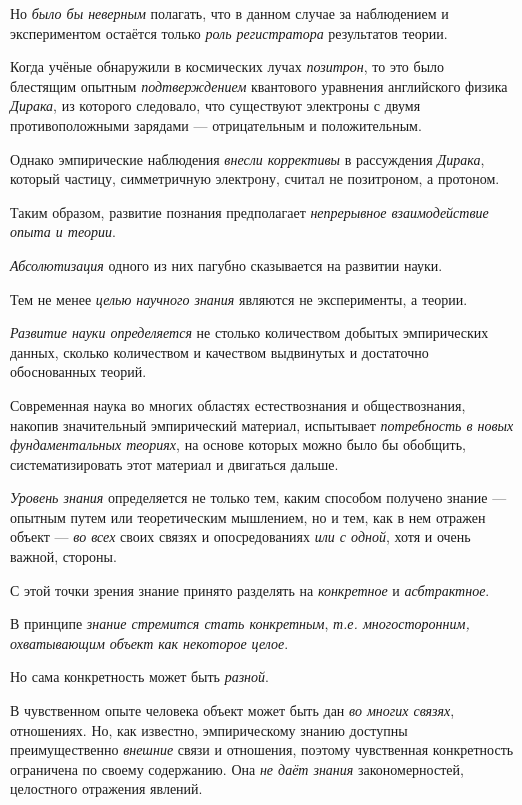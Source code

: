 \documentclass[a4paper,14pt,russian]{extreport}
\begin{document}
Но \emph{было бы неверным} полагать, что в данном случае за наблюдением и экспериментом остаётся только \emph{роль регистратора} результатов теории.

Когда учёные обнаружили в космических лучах \emph{позитрон}, то это было блестящим опытным \emph{подтверждением} квантового уравнения английского физика \emph{Дирака}, из которого следовало, что существуют электроны с двумя противоположными зарядами --- отрицательным и положительным.

Однако эмпирические наблюдения \emph{внесли коррективы} в рассуждения \emph{Дирака}, который частицу, симметричную электрону, считал не позитроном, а протоном.

Таким образом, развитие познания предполагает \emph{непрерывное взаимодействие опыта и теории}.

\emph{Абсолютизация} одного из них пагубно сказывается на развитии науки.

Тем не менее \emph{целью научного знания} являются не эксперименты, а теории.

\emph{Развитие науки определяется} не столько количеством добытых эмпирических данных, сколько количеством и качеством выдвинутых и достаточно обоснованных теорий.

Современная наука во многих областях естествознания и обществознания, накопив значительный эмпирический материал, испытывает \emph{потребность в новых фундаментальных теориях}, на основе которых можно было бы обобщить, систематизировать этот материал и двигаться дальше.

\emph{Уровень знания} определяется не только тем, каким способом получено знание --- опытным путем или теоретическим мышлением, но и тем, как в нем отражен объект --- \emph{во всех} своих связях и опосредованиях \emph{или с одной}, хотя и очень важной, стороны.

С этой точки зрения знание принято разделять на \emph{конкретное} и \emph{асбтрактное}.

В принципе \emph{знание стремится стать конкретным}, \emph{т.е. многосторонним, охватывающим объект как некоторое целое}.

Но сама конкретность может быть \emph{разной}.

В чувственном опыте человека объект может быть дан \emph{во многих связях}, отношениях. Но, как известно, эмпирическому знанию доступны преимущественно \emph{внешние} связи и отношения, поэтому чувственная конкретность ограничена по своему содержанию. Она \emph{не даёт знания} закономерностей, целостного отражения явлений.
\end{document}
